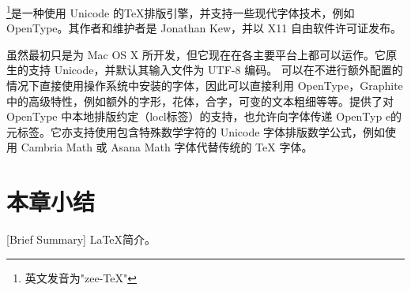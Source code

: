 \XeTeX{}\footnote{英文发音为"zee-\TeX{}"}是一种使用 Unicode 的\TeX{}排版引擎，并支持一些现代字体技术，例如 OpenType。其作者和维护者是 Jonathan Kew，并以 X11 自由软件许可证发布。

虽然\XeTeX{}最初只是为 Mac OS X 所开发，但它现在在各主要平台上都可以运作。它原生的支持 Unicode，并默认其输入文件为 UTF-8 编码。\XeTeX{} 可以在不进行额外配置的情况下直接使用操作系统中安装的字体，因此可以直接利用 OpenType，Graphite 中的高级特性，例如额外的字形，花体，合字，可变的文本粗细等等。\XeTeX{}提供了对 OpenType 中本地排版约定（locl标签）的支持，也允许向字体传递 OpenTyp e的元标签。它亦支持使用包含特殊数学字符的 Unicode 字体排版数学公式，例如使用 Cambria Math 或 Asana Math 字体代替传统的 \TeX{} 字体。

\section*{本章小结}[Brief Summary]
\LaTeX{}简介。
